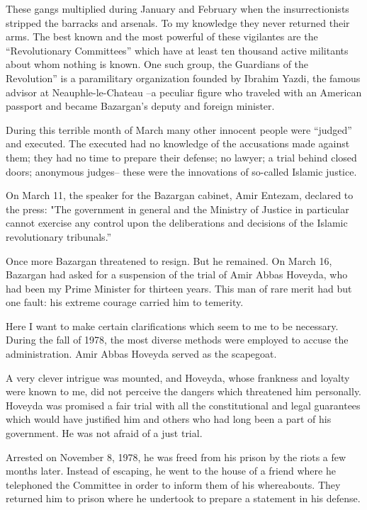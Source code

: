 These gangs multiplied during January and February when the insurrectionists stripped the barracks and arsenals. To my knowledge they never returned their arms. The best known and the most powerful of these vigilantes are the “Revolutionary Committees” which have at least ten thousand active militants about whom nothing is known. One such group, the Guardians of the Revolution” is a paramilitary organization founded by Ibrahim Yazdi, the famous advisor at Neauphle-le-Chateau --a peculiar figure who traveled with an American passport and became Bazargan’s deputy and foreign minister. 

During this terrible month of March many other innocent people were “judged” and executed. The executed had no knowledge of the accusations made against them; they had no time to prepare their defense; no lawyer; a trial behind closed doors; anonymous judges-- these were the innovations of so-called Islamic justice. 

On March 11, the speaker for the Bazargan cabinet, Amir Entezam, declared to the press: "The government in general and the Ministry of Justice in particular cannot exercise any control upon the deliberations and decisions of the Islamic revolutionary tribunals.” 

Once more Bazargan threatened to resign. But he remained. On March 16, Bazargan had asked for a suspension of the trial of Amir Abbas Hoveyda, who had been my Prime Minister for thirteen years. This man of rare merit had but one fault: his extreme courage carried him to temerity. 


Here I want to make certain clarifications which seem to me to be necessary. During the fall of 1978, the most diverse methods were employed to accuse the administration. Amir Abbas Hoveyda served as the scapegoat. 

A very clever intrigue was mounted, and Hoveyda, whose frankness and loyalty were known to me, did not perceive the dangers which threatened him personally. Hoveyda was promised a fair trial with all the constitutional and legal guarantees which would have justified him and others who had long been a part of his government. He was not afraid of a just trial. 

Arrested on November 8, 1978, he was freed from his prison by the riots a few months later. Instead of escaping, he went to the house of a friend where he telephoned the Committee in order to inform them of his whereabouts. They returned him to prison where he undertook to prepare a statement in his defense. 

